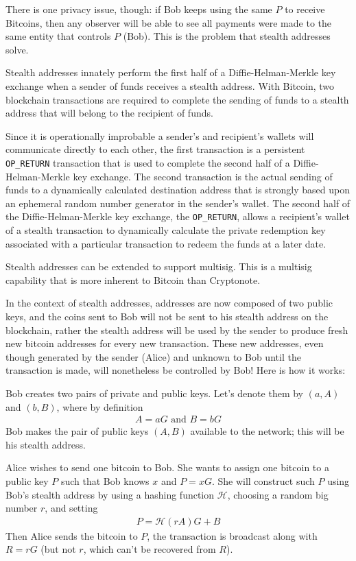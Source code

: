 There is one privacy issue, though: if Bob keeps using the same $P$ to receive Bitcoins, then any observer will be able to see all payments were made to the same entity that controls $P$ (Bob). This is the problem that stealth addresses solve.

Stealth addresses innately perform the first half of a Diffie-Helman-Merkle key exchange when a sender of funds receives a stealth address. With Bitcoin, two blockchain transactions are required to complete the sending of funds to a stealth address that will belong to the recipient of funds.

Since it is operationally improbable a sender's and recipient's wallets will communicate directly to each other, the first transaction is a persistent \verb|OP_RETURN| transaction that is used to complete the second half of a Diffie-Helman-Merkle key exchange. The second transaction is the actual sending of funds to a dynamically calculated destination address that is strongly based upon an ephemeral random number generator in the sender's wallet. The second half of the Diffie-Helman-Merkle key exchange, the \verb|OP_RETURN|, allows a recipient's wallet of a stealth transaction to dynamically calculate the private redemption key associated with a particular transaction to redeem the funds at a later date.

Stealth addresses can be extended to support multisig. This is a multisig capability that is more inherent to Bitcoin than Cryptonote.

In the context of stealth addresses, addresses are now composed of two public keys, and the coins sent to Bob will not be sent to his stealth address on the blockchain, rather the stealth address will be used by the sender to produce fresh new bitcoin addresses for every new transaction. These new addresses, even though generated by the sender (Alice) and unknown to Bob until the transaction is made, will nonetheless be controlled by Bob! Here is how it works:

Bob creates two pairs of private and public keys. Let's denote them by $(a,A)$ and $(b,B)$, where by definition
\begin{align*}
  A = aG \mbox{ and } B = bG
\end{align*}
Bob makes the pair of public keys $(A,B)$ available to the network; this will be his stealth address.

Alice wishes to send one bitcoin to Bob. She wants to assign one bitcoin to a public key $P$ such that Bob knows $x$ and $P = xG$. She will construct such $P$ using Bob's stealth address by using a hashing function $\mathcal{H}$, choosing a random big number $r$, and setting
\begin{align*}
  P = \mathcal{H}(rA)G + B
\end{align*}
Then Alice sends the bitcoin to $P$, the transaction is broadcast along with $R = rG$ (but not $r$, which can't be recovered from $R$).

